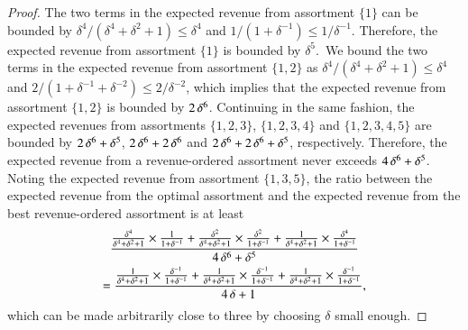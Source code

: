 \begin{proof}
\noindent The two terms in the expected revenue from assortment $\{ 1\}$ can be bounded by $\delta^4 / (\delta^4 + \delta^2 + 1) \leq \delta^4$ and $1 / ( 1 + \delta^{-1}) \leq 1 / \delta^{-1}$. Therefore, the expected revenue from assortment $\{1\}$ is bounded by $\delta^5$.~We bound the two terms in the expected revenue from assortment $\{1,2\}$ as $\delta^4 / (\delta^4 + \delta^2 + 1) \leq \delta^4$ and $2 / ( 1 + \delta^{-1} + \delta^{-2}) \leq 2 / \delta^{-2}$, which implies that the expected revenue from assortment $\{1,2\}$ is bounded by $2 {\,} \delta^6$. Continuing in the same fashion, the expected revenues from assortments $\{1,2,3\}$, $\{1,2,3,4\}$ and $\{1,2,3,4,5\}$ are bounded by $2 {\,} \delta^6 + \delta^5$, $2 {\,} \delta^6 + 2 {\,} \delta^6$ and $2 {\,} \delta^6 + 2 {\,} \delta^6 + \delta^5$, respectively. Therefore, the expected revenue from a revenue-ordered assortment never exceeds $4 {\,} \delta^6 + \delta^5$. Noting the expected revenue from assortment $\{1,3,5\}$, the ratio between the expected revenue from the optimal assortment and the expected revenue from the best revenue-ordered assortment is at least 
%
%
\begin{multline*}
\frac{
\frac{\delta^4}{\delta^4 + \delta^2 + 1} \times \frac{1}{1 + \delta^{-1}}
+
\frac{\delta^2}{\delta^4 + \delta^2 + 1} \times \frac{\delta^2}{1 + \delta^{-1}}
+
\frac{1}{\delta^4 + \delta^2 + 1} \times \frac{\delta^4}{1 + \delta^{-1}}
}
{4 {\,} \delta^6 + \delta^5}
\\
=
\frac{
\frac{1}{\delta^4 + \delta^2 + 1} \times \frac{\delta^{-1}}{1 + \delta^{-1}}
+
\frac{1}{\delta^4 + \delta^2 + 1} \times \frac{\delta^{-1}}{1 + \delta^{-1}}
+
\frac{1}{\delta^4 + \delta^2 + 1} \times \frac{\delta^{-1}}{1 + \delta^{-1}}
}
{4 {\,} \delta + 1},
\end{multline*}
which can be made arbitrarily close to three by choosing $\delta$ small enough.
\end{proof}
